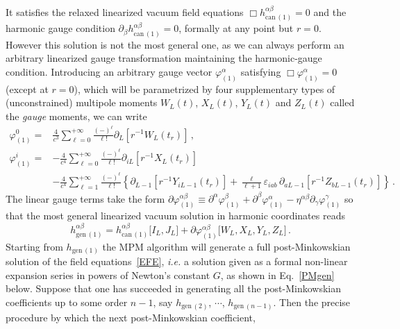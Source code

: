 \documentclass[prd,preprint,superscriptaddress,tightenlines,nofootinbib,
  eqsecnum,showpacs]{revtex4}
\begin{document}
%
It satisfies the relaxed linearized vacuum field equations $\Box
h_{\mathrm{can}\,(1)}^{\alpha\beta}=0$ and the harmonic gauge
condition $\partial_\beta h_{\mathrm{can}\,(1)}^{\alpha\beta} =0$,
formally at any point but $r=0$. However this solution is not the most
general one, as we can always perform an arbitrary linearized gauge
transformation maintaining the harmonic-gauge condition. Introducing
an arbitrary gauge vector $\varphi_{(1)}^\alpha$ satisfying
$\Box\varphi_{(1)}^\alpha=0$ (except at $r=0$), which will be
parametrized by four supplementary types of (unconstrained) multipole
moments $W_L(t)$, $X_L(t)$, $Y_L(t)$ and $Z_L(t)$ called the
\textit{gauge} moments, we can write
%
\begin{subequations} \label{phi1}
\begin{align}
\varphi^0_{(1)} =& \frac{4}{c^3} \sum_{\ell = 0}^{+\infty}
\frac{(-)^\ell}{\ell !}  \partial_L \left[ r^{-1} W_L (t_r)\right]
\,, \\ \varphi^i_{(1)} =& -\frac{4}{c^4} \sum_{\ell = 0}^{+\infty}
\frac{(-)^\ell}{ \ell !}  \partial_{iL} \left[ r^{-1} X_L
  (t_r)\right] \\ & -\frac{4}{c^4} \sum_{\ell = 1}^{+\infty}
\frac{(-)^\ell}{\ell !}  \left\{ \partial_{L-1} \left[ r^{-1} Y_{iL-1}
  (t_r)\right] + \frac{\ell}{\ell+1} \varepsilon_{iab} \,
\partial_{aL-1} \left[ r^{-1} Z_{bL-1} (t_r)\right]\right\} \,.
\end{align}
\end{subequations}
%
The linear gauge terms take the form
$\partial\varphi_{(1)}^{\alpha\beta} \equiv
\partial^\alpha\varphi_{(1)}^{\beta} +
\partial^\beta\varphi_{(1)}^{\alpha} -
\eta^{\alpha\beta}\partial_\gamma\varphi_{(1)}^{\gamma}$ so that the
most general linearized vacuum solution in harmonic coordinates reads
%
\begin{equation} \label{hgen1}
h_{\mathrm{gen}\,(1)}^{\alpha\beta} =
h_{\mathrm{can}\,(1)}^{\alpha\beta}\bigl[I_L,J_L\bigr] +
\partial\varphi_{(1)}^{\alpha\beta}\bigl[W_L,X_L,Y_L,Z_L\bigr]\,.
\end{equation}
%
Starting from $h_{\mathrm{gen}\,(1)}$ the MPM algorithm will generate a full
post-Minkowskian solution of the field equations~\eqref{EFE}, \textit{i.e.} a
solution given as a formal non-linear expansion series in powers of Newton's
constant $G$, as shown in Eq.~\eqref{PMgen} below. Suppose that one has
succeeded in generating all the post-Minkowskian coefficients up to some order
$n-1$, say $h_{\mathrm{gen}\,(2)}$, $\cdots$, $h_{\mathrm{gen}\,(n-1)}$. Then
the precise procedure by which the next post-Minkowskian coefficient,
\end{document}
